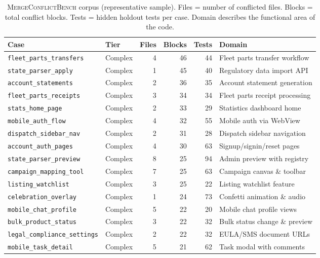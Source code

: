 \documentclass[11pt,a4paper]{article}
\begin{document}
\begin{table}[H]
\centering
\caption{\textsc{MergeConflictBench} corpus (representative sample). Files = number of conflicted files. Blocks = total conflict blocks. Tests = hidden holdout tests per case. Domain describes the functional area of the code.}
\label{tab:corpus}
\small
\begin{tabular}{llrrrl}
\toprule
\textbf{Case} & \textbf{Tier} & \textbf{Files} & \textbf{Blocks} & \textbf{Tests} & \textbf{Domain} \\
\midrule
\texttt{fleet\_parts\_transfers}   & Complex  & 4 & 46 & 44  & Fleet parts transfer workflow \\
\texttt{state\_parser\_apply}      & Complex  & 1 & 45 & 40  & Regulatory data import API \\
\texttt{account\_statements}       & Complex  & 2 & 36 & 35  & Account statement generation \\
\texttt{fleet\_parts\_receipts}    & Complex  & 3 & 34 & 34  & Fleet parts receipt processing \\
\texttt{stats\_home\_page}         & Complex  & 2 & 33 & 29  & Statistics dashboard home \\
\texttt{mobile\_auth\_flow}        & Complex  & 4 & 32 & 55  & Mobile auth via WebView \\
\texttt{dispatch\_sidebar\_nav}    & Complex  & 2 & 31 & 28  & Dispatch sidebar navigation \\
\texttt{account\_auth\_pages}      & Complex  & 4 & 30 & 63  & Signup/signin/reset pages \\
\texttt{state\_parser\_preview}    & Complex  & 8 & 25 & 94  & Admin preview with registry \\
\texttt{campaign\_mapping\_tool}   & Complex  & 7 & 25 & 63  & Campaign canvas \& toolbar \\
\texttt{listing\_watchlist}        & Complex  & 3 & 25 & 22  & Listing watchlist feature \\
\texttt{celebration\_overlay}      & Complex  & 1 & 24 & 73  & Confetti animation \& audio \\
\texttt{mobile\_chat\_profile}     & Complex  & 5 & 22 & 20  & Mobile chat profile views \\
\texttt{bulk\_product\_status}     & Complex  & 3 & 22 & 32  & Bulk status change \& preview \\
\texttt{legal\_compliance\_settings}& Complex & 2 & 22 & 32  & EULA/SMS document URLs \\
\texttt{mobile\_task\_detail}      & Complex  & 5 & 21 & 62  & Task modal with comments \\

\end{tabular}
\end{table}
\end{document}
